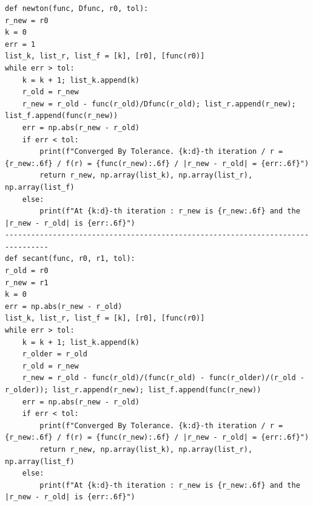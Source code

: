 \documentclass{article} %
\begin{document}
\begin{lstlisting}[title={Root-Finding Methods(Bisection, Fixed-point iteration, Newton's, Secant) in Python}]
def newton(func, Dfunc, r0, tol):
r_new = r0
k = 0
err = 1
list_k, list_r, list_f = [k], [r0], [func(r0)]
while err > tol:
    k = k + 1; list_k.append(k)
    r_old = r_new
    r_new = r_old - func(r_old)/Dfunc(r_old); list_r.append(r_new); list_f.append(func(r_new))
    err = np.abs(r_new - r_old)
    if err < tol:
        print(f"Converged By Tolerance. {k:d}-th iteration / r = {r_new:.6f} / f(r) = {func(r_new):.6f} / |r_new - r_old| = {err:.6f}")
        return r_new, np.array(list_k), np.array(list_r), np.array(list_f)
    else:
        print(f"At {k:d}-th iteration : r_new is {r_new:.6f} and the |r_new - r_old| is {err:.6f}")
--------------------------------------------------------------------------------
def secant(func, r0, r1, tol):
r_old = r0
r_new = r1
k = 0
err = np.abs(r_new - r_old)
list_k, list_r, list_f = [k], [r0], [func(r0)]
while err > tol:
    k = k + 1; list_k.append(k)
    r_older = r_old
    r_old = r_new
    r_new = r_old - func(r_old)/(func(r_old) - func(r_older)/(r_old - r_older)); list_r.append(r_new); list_f.append(func(r_new))
    err = np.abs(r_new - r_old)
    if err < tol:
        print(f"Converged By Tolerance. {k:d}-th iteration / r = {r_new:.6f} / f(r) = {func(r_new):.6f} / |r_new - r_old| = {err:.6f}")
        return r_new, np.array(list_k), np.array(list_r), np.array(list_f)
    else:
        print(f"At {k:d}-th iteration : r_new is {r_new:.6f} and the |r_new - r_old| is {err:.6f}")
\end{lstlisting}
\end{document}
